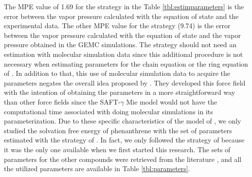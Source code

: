 The MPE value of 1.69 for the  strategy in the Table \ref{tbl:estimparameters} is the error between the vapor pressure calculated with the equation of state and the experimental data. The other MPE value for the  strategy (9.74) is the error between the vapor pressure calculated with the equation of state and the vapor pressure obtained in the GEMC simulations. The  strategy should not need an estimation with molecular simulation data since this additional procedure is not necessary when estimating parameters for the chain equation \cite{avendano2011} or the ring equation of . In addition to that, this use of molecular simulation data to acquire the parameters negates the overall idea proposed by \cite{avendano2011}. They developed this force field with the intention of obtaining the parameters in a more straightforward way than other force fields since the SAFT-$\gamma$ Mie model would not have the computational time associated with doing molecular simulations in its parameterization. Due to these specific characteristics of the model of , we only studied the solvation free energy of phenanthrene with the set of parameters estimated with the strategy of . In fact, we only followed the strategy of  because it was the only one available when we first started this research. The sets of parameters for the other compounds were retrieved from the literature \cite{lobanova2016,herdes2015,ervik2016,muller2017}, and all the utilized parameters are available in Table \ref{tbl:parameters}.

